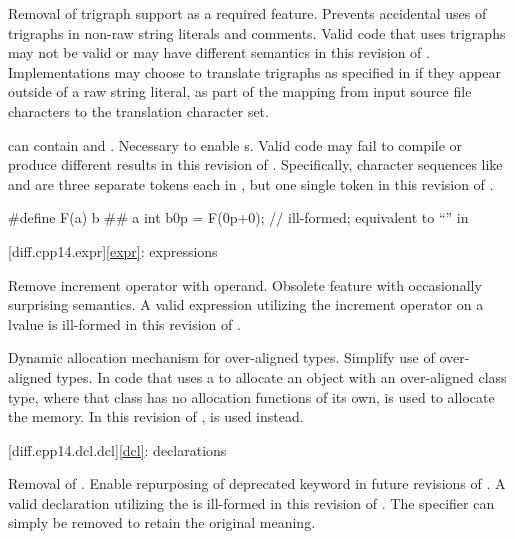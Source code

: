 %
\change
Removal of trigraph support as a required feature.
\rationale
Prevents accidental uses of trigraphs in non-raw string literals and comments.
\effect
Valid \CppXIV{} code that uses trigraphs may not be valid or may have different
semantics in this revision of \Cpp{}. Implementations may choose to
translate trigraphs as specified in \CppXIV{} if they appear outside of a raw
string literal, as part of the
mapping from input source file characters to
the translation character set.

\change
{} can contain   and
 .
\rationale
Necessary to enable s.
\effect
Valid \CppXIV{} code may fail to compile or produce different results in
this revision of \Cpp{}. Specifically, character sequences like 
and  are three separate tokens each in \CppXIV{}, but one single token
in this revision of \Cpp{}.
\begin{example}
\begin{codeblock}
#define F(a) b ## a
int b0p = F(0p+0);  // ill-formed; equivalent to ``\!'' in \CppXIV{}
\end{codeblock}
\end{example}

[diff.cpp14.expr]{\ref{expr}: expressions}

\change
Remove increment operator with  operand.
\rationale
Obsolete feature with occasionally surprising semantics.
\effect
A valid \CppXIV{} expression utilizing the increment operator on
a  lvalue is ill-formed in this revision of \Cpp{}.

\change
Dynamic allocation mechanism for over-aligned types.
\rationale
Simplify use of over-aligned types.
\effect
In \CppXIV{} code that uses a 
to allocate an object with an over-aligned class type,
where that class has no allocation functions of its own,
is used to allocate the memory.
In this revision of \Cpp{},
is used instead.

[diff.cpp14.dcl.dcl]{\ref{dcl}: declarations}

%
\change
Removal of  .
\rationale
Enable repurposing of deprecated keyword in future revisions of \Cpp{}.
\effect
A valid \CppXIV{} declaration utilizing the 
 is ill-formed in this revision of \Cpp{}.
The specifier can simply be removed to retain the original meaning.

